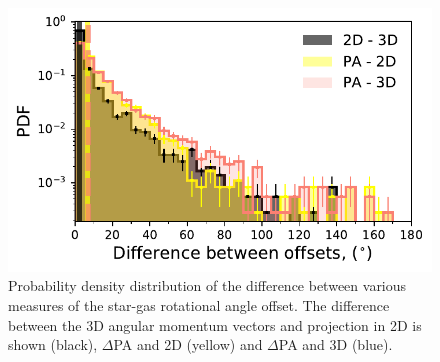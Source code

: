 \documentclass[fleqn,usenatbib]{mnras}
\begin{document}
\begin{figure}
	\includegraphics[width=\linewidth]{tng_appendix/PA_alpha_resid_hist.pdf}
    \caption{Probability density distribution of the difference between various measures of the star-gas rotational angle offset. The difference between the 3D angular momentum vectors and projection in 2D is shown (black), $\Delta$PA and 2D (yellow) and $\Delta$PA and 3D (blue).}
    \label{fig:PA_residual}
\end{figure}


\bsp	%
\label{lastpage}
\end{document}
